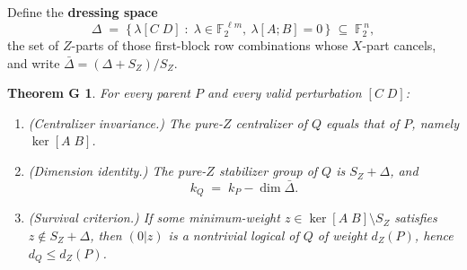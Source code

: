 \documentclass[11pt]{article}
\theoremstyle{plain}
\newtheorem*{theoremG}{Theorem G}
\theoremstyle{remark}
\begin{document}
Define the \textbf{dressing space}
\[
\Delta \;=\; \big\{\, \lambda[C\;D] \;:\; \lambda\in\mathbb{F}_2^{\,\ell m},\ \lambda[A;B]=0 \,\big\} \;\subseteq\; \mathbb{F}_2^{\,n},
\]
the set of $Z$-parts of those first-block row combinations whose $X$-part cancels, and
write $\bar\Delta=(\Delta+S_Z)/S_Z$.

\begin{theoremG}
For every parent $P$ and every valid perturbation $[C\;D]$:
\begin{enumerate}
\item[(i)] \emph{(Centralizer invariance.)} The pure-$Z$ centralizer of $Q$ equals that of $P$, namely
   $\ker[A\;B]$.
\item[(ii)] \emph{(Dimension identity.)} The pure-$Z$ stabilizer group of $Q$ is $S_Z+\Delta$, and
   \[
   k_Q \;=\; k_P - \dim\bar\Delta .
   \]
\item[(iii)] \emph{(Survival criterion.)} If some minimum-weight $z\in\ker[A\;B]\setminus S_Z$ satisfies
   $z\notin S_Z+\Delta$, then $(0|z)$ is a nontrivial logical of $Q$ of weight $d_Z(P)$,
   hence $d_Q\le d_Z(P)$.
\end{enumerate}
\end{theoremG}
\end{document}
